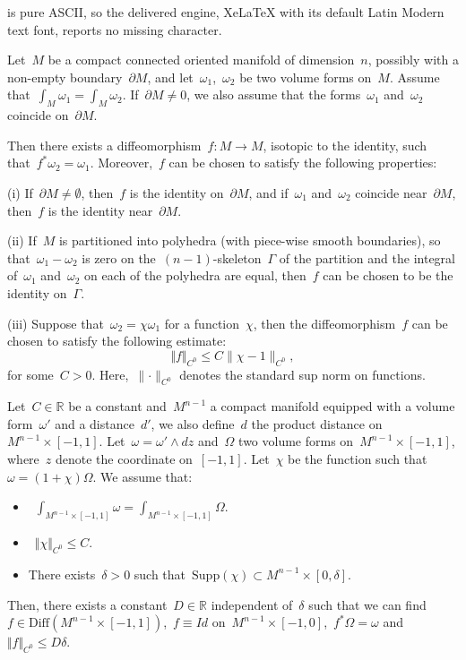 \documentclass[10pt,a4paper]{amsart}
\begin{document}
is pure ASCII, so the delivered engine, XeLaTeX with its default Latin Modern text font, reports no missing character.
\begin{prop}\label{prop: Moser's trick}
Let~$M$ be a compact connected oriented manifold of dimension~$n$, possibly with a non-empty boundary~$\partial M$, and let~$\omega_1$,~$\omega_2$ be two volume forms on~$M$. Assume that~$\int_M \omega_1=\int_M\omega_2$. If~$\partial M\neq 0$, we also assume that the forms~$\omega_1$ and~$\omega_2$ coincide on~$\partial M$.

Then there exists a diffeomorphism~$f: M \rightarrow M$, isotopic to the identity, such that~$f^* \omega_2=\omega_1$. Moreover,~$f$ can be chosen to satisfy the following properties: 

\medskip


(i) If~$\partial M \neq \emptyset$, then~$f$ is the identity on~$\partial M$, and if~$\omega_1$ and~$\omega_2$ coincide near~$\partial M$, then~$f$ is the identity near~$\partial M$.

\medskip
 
(ii) If~$M$ is partitioned into polyhedra (with piece-wise smooth boundaries), so that~$\omega_1-\omega_2$ is zero on the~$(n-1)$-skeleton~$\Gamma$ of the partition and the integral of~$\omega_1$ and~$\omega_2$ on each of the polyhedra are equal, then~$f$ can be chosen to be the identity on~$\Gamma$.
 
\medskip
 
(iii) Suppose that~$\omega_2=\chi\omega_1$ for a function~$\chi$, then the diffeomorphism~$f$ can be chosen to satisfy the following estimate: 
$$\Vert f \Vert_{C^0}\leq C \lVert\chi-1 \rVert_{C^0},$$
for some~$C>0$. Here,~$\lVert \cdot \rVert_{C^0}$ denotes the standard sup norm on functions.
\end{prop}

\begin{prop}\label{prop: adjusting volume forms}
Let~$C\in \mathbb{R}$ be a constant and~$M^{n-1}$ a compact manifold equipped with a volume form~$\omega'$ and a distance~$d'$, we also define~$d$ the product distance on~$M^{n-1}\times [-1,1]$. Let~$\omega=\omega' \wedge dz$ and~$\Omega$ two volume forms on~$M^{n-1}\times [-1,1]$, where~$z$ denote the coordinate on~$[-1,1]$. Let~$\chi$ be the function such that~$\omega=(1+\chi)\Omega$. We assume that: 

\begin{itemize}
    \item~$\int_{M^{n-1}\times [-1,1]}\omega =\int_{M^{n-1}\times [-1,1]}\Omega.$
    \item~$\Vert \chi \Vert_{C^0}\leq C.$
    \item There exists~$\delta>0$ such that~$\text{Supp}(\chi)\subset M^{n-1}\times [0,\delta].$
\end{itemize}
Then, there exists a constant~$D\in \mathbb{R}$ independent of~$\delta$ such that we can find~$f\in \text{Diff}(M^{n-1}\times[-1,1])$,~$f\equiv Id$ on~$M^{n-1}\times [-1,0]$,~$f^*\Omega=\omega$ and~$\Vert f \Vert_{C^0}\leq D\delta$.
\end{prop}
\end{document}
